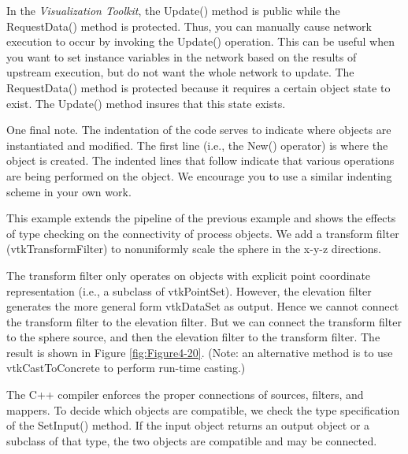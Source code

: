 \begin{description}[leftmargin=0cm,labelindent=0cm]
In the \emph{Visualization Toolkit}, the Update() method is public while the RequestData() method is protected. Thus, you can manually cause network execution to occur by invoking the Update() operation. This can be useful when you want to set instance variables in the network based on the results of upstream execution, but do not want the whole network to update. The RequestData() method is protected because it requires a certain object state to exist. The Update() method insures that this state exists.

One final note. The indentation of the code serves to indicate where objects are instantiated and modified. The first line (i.e., the New() operator) is where the object is created. The indented lines that follow indicate that various operations are being performed on the object. We encourage you to use a similar indenting scheme in your own work.

\item[Warped Sphere.] This example extends the pipeline of the previous example and shows the effects of type checking on the connectivity of process objects. We add a transform filter (vtkTransformFilter) to nonuniformly scale the sphere in the x-y-z directions.

The transform filter only operates on objects with explicit point coordinate representation (i.e., a subclass of vtkPointSet). However, the elevation filter generates the more general form vtkDataSet as output. Hence we cannot connect the transform filter to the elevation filter. But we can connect the transform filter to the sphere source, and then the elevation filter to the transform filter. The result is shown in Figure \ref{fig:Figure4-20}. (Note: an alternative method is to use vtkCastToConcrete to perform run-time casting.)

The C++ compiler enforces the proper connections of sources, filters, and mappers. To decide which objects are compatible, we check the type specification of the SetInput() method. If the input object returns an output object or a subclass of that type, the two objects are compatible and may be connected.


\end{description}
